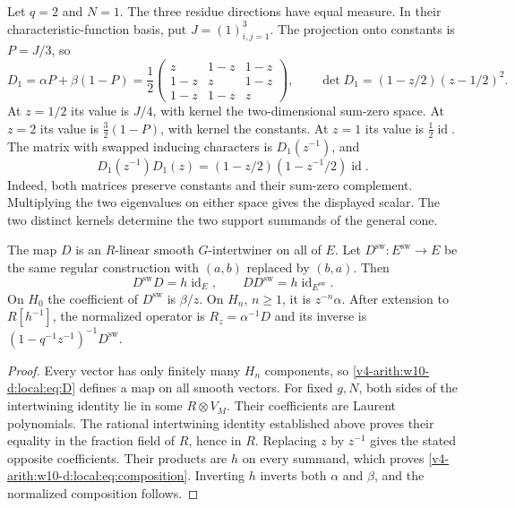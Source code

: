 \begin{example}\label{v4-arith:w10-d:local:ex:first}
Let $q=2$ and $N=1$.
The three residue directions have equal measure.
In their characteristic-function basis, put $J=(1)_{i,j=1}^3$.
The projection onto constants is $P=J/3$, so
\[
 D_1=\alpha P+\beta(1-P)
 =\frac12\begin{pmatrix}
 z&1-z&1-z\\1-z&z&1-z\\1-z&1-z&z
 \end{pmatrix},\qquad
 \det D_1=(1-z/2)(z-1/2)^2.
\]
At $z=1/2$ its value is $J/4$, with kernel the two-dimensional sum-zero space.
At $z=2$ its value is $\frac32(1-P)$, with kernel the constants.
At $z=1$ its value is $\frac12\operatorname{id}$.
The matrix with swapped inducing characters is $D_1(z^{-1})$, and
\[
 D_1(z^{-1})D_1(z)=(1-z/2)(1-z^{-1}/2)\operatorname{id}.
\]
Indeed, both matrices preserve constants and their sum-zero complement.
Multiplying the two eigenvalues on either space gives the displayed scalar.
The two distinct kernels determine the two support summands of the general cone.
\end{example}

\begin{proposition}\label{v4-arith:w10-d:local:prop:regular}
The map $D$ is an $R$-linear smooth $G$-intertwiner on all of $E$.
Let $D^\mathrm{sw}:E^\mathrm{sw}\to E$ be the same regular construction with $(a,b)$ replaced by $(b,a)$.
Then
\begin{equation}\label{v4-arith:w10-d:local:eq:composition}
 D^\mathrm{sw} D=h\operatorname{id}_E,\qquad DD^\mathrm{sw}=h\operatorname{id}_{E^\mathrm{sw}}.
\end{equation}
On $H_0$ the coefficient of $D^\mathrm{sw}$ is $\beta/z$.
On $H_n$, $n\ge1$, it is $z^{-n}\alpha$.
After extension to $R[h^{-1}]$, the normalized operator is
$R_z=\alpha^{-1}D$ and its inverse is $(1-q^{-1}z^{-1})^{-1}D^\mathrm{sw}$.
\end{proposition}
\begin{proof}
Every vector has only finitely many $H_n$ components, so \eqref{v4-arith:w10-d:local:eq:D} defines a map on all smooth vectors.
For fixed $g,N$, both sides of the intertwining identity lie in some $R\otimes V_M$.
Their coefficients are Laurent polynomials.
The rational intertwining identity established above proves their equality in the fraction field of $R$, hence in $R$.
Replacing $z$ by $z^{-1}$ gives the stated opposite coefficients.
Their products are $h$ on every summand, which proves \eqref{v4-arith:w10-d:local:eq:composition}.
Inverting $h$ inverts both $\alpha$ and $\beta$, and the normalized composition follows.
\end{proof}

